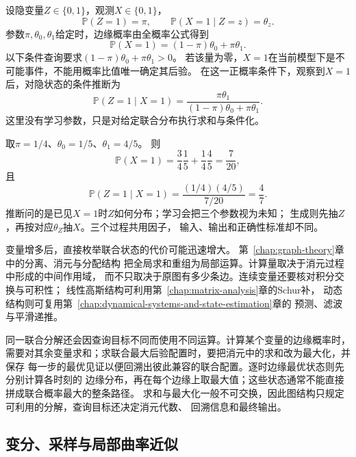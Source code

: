 设隐变量$Z\in\{0,1\}$，观测$X\in\{0,1\}$，
\[
  \mathbb{P}(Z=1)=\pi,
  \qquad
  \mathbb{P}(X=1\mid Z=z)=\theta_z.
\]
参数$\pi,\theta_0,\theta_1$给定时，边缘概率由全概率公式得到
\[
  \mathbb{P}(X=1)
  =
  (1-\pi)\theta_0+\pi\theta_1.
\]
以下条件查询要求$(1-\pi)\theta_0+\pi\theta_1>0$。
若该量为零，$X=1$在当前模型下是不可能事件，不能用概率比值唯一确定其后验。
在这一正概率条件下，观察到$X=1$后，对隐状态的条件推断为
\begin{equation}
  \mathbb{P}(Z=1\mid X=1)
  =
  \frac{\pi\theta_1}
  {(1-\pi)\theta_0+\pi\theta_1}.
  \label{eq:future-latent-posterior}
\end{equation}
这里没有学习参数，只是对给定联合分布执行求和与条件化。

\begin{example}[同一联合分布上的三个问题]
  \label{ex:future-latent-three-questions}
  取$\pi=1/4$、$\theta_0=1/5$、$\theta_1=4/5$。
  则
  \[
    \mathbb{P}(X=1)
    =
    \frac{3}{4}\frac{1}{5}
    +
    \frac{1}{4}\frac{4}{5}
    =
    \frac{7}{20},
  \]
  且
  \[
    \mathbb{P}(Z=1\mid X=1)
    =
    \frac{(1/4)(4/5)}{7/20}
    =
    \frac{4}{7}.
  \]
  推断问的是已见$X=1$时$Z$如何分布；学习会把三个参数视为未知；
  生成则先抽$Z$，再按对应$\theta_Z$抽$X$。三个过程共用因子，
  输入、输出和正确性标准却不同。
\end{example}

变量增多后，直接枚举联合状态的代价可能迅速增大。
第~\ref{chap:graph-theory}章中的分离、消元与分配结构
把全局求和重组为局部运算。计算量取决于消元过程中形成的中间作用域，
而不只取决于原图有多少条边。连续变量还要核对积分交换与可积性；
线性高斯结构可利用第~\ref{chap:matrix-analysis}章的Schur补，
动态结构则可复用第~\ref{chap:dynamical-systems-and-state-estimation}章的
预测、滤波与平滑递推。

同一联合分解还会因查询目标不同而使用不同运算。计算某个变量的边缘概率时，
需要对其余变量求和；求联合最大后验配置时，要把消元中的求和改为最大化，并保存
每一步的最优见证以便回溯出彼此兼容的联合配置。逐时边缘最优状态则先分别计算各时刻的
边缘分布，再在每个边缘上取最大值；这些状态通常不能直接拼成联合概率最大的整条路径。
求和与最大化一般不可交换，因此图结构只规定可利用的分解，查询目标还决定消元代数、
回溯信息和最终输出。

\subsection{变分、采样与局部曲率近似}
\label{sec:future-exact-query-three-approximations}

